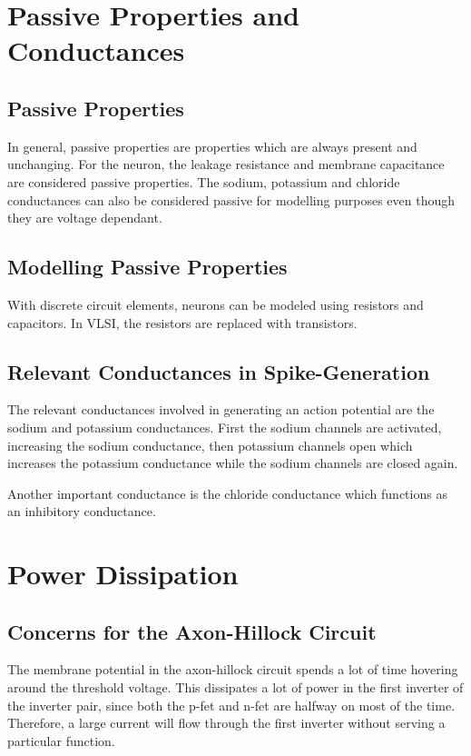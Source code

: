 


\newpage
\section{Passive Properties and Conductances}
\subsection{Passive Properties}
In general, passive properties are properties which are always present and unchanging. For the neuron, the leakage resistance
and membrane capacitance are considered passive properties. The sodium, potassium and chloride conductances can also be considered
passive for modelling purposes even though they are voltage dependant.

\subsection{Modelling Passive Properties}
With discrete circuit elements, neurons can be modeled using resistors and capacitors. In VLSI, the resistors are replaced with 
transistors.

\subsection{Relevant Conductances in Spike-Generation}
The relevant conductances involved in generating an action potential are the sodium and potassium conductances. First the 
sodium channels are activated, increasing the sodium conductance, then potassium channels open which increases the potassium conductance while
the sodium channels are closed again.

Another important conductance is the chloride conductance which functions as an inhibitory conductance.

\section{Power Dissipation}
\subsection{Concerns for the Axon-Hillock Circuit}
The membrane potential in the axon-hillock circuit spends a lot of time hovering around the threshold voltage. This dissipates a lot of
power in the first inverter of the inverter pair, since both the p-fet and n-fet are halfway on most of the time. Therefore, a large current
will flow through the first inverter without serving a particular function.

